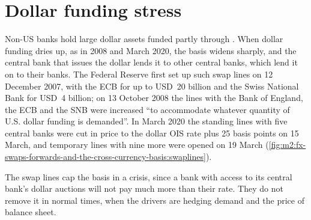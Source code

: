 \section{Dollar funding stress}

Non-US banks hold large dollar assets funded partly through . When
dollar funding dries up, as in 2008 and March 2020, the basis widens sharply,
and the central bank that issues the dollar lends it to other central banks,
which lend it on to their banks. The Federal Reserve first set up such swap
lines on 12 December 2007, with the ECB for up to USD~20 billion and the Swiss
National Bank for USD~4 billion; on 13 October 2008 the lines with the Bank of
England, the ECB and the SNB were increased ``to accommodate whatever quantity of
U.S. dollar funding is demanded''. In March 2020 the standing lines with five
central banks were cut in price to the dollar OIS rate plus 25 basis points on 15
March, and temporary lines with nine more were opened on 19 March
(\cref{fig:m2:fx-swaps-forwards-and-the-cross-currency-basis:swaplines}).

\begin{omfigure}

\label{fig:m2:fx-swaps-forwards-and-the-cross-currency-basis:swaplines}
\end{omfigure}

The swap lines cap the basis in a crisis, since a bank with access to its central
bank's dollar auctions will not pay much more than their rate. They do not remove
it in normal times, when the drivers are hedging demand and the price of balance
sheet.

